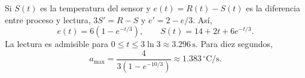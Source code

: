 Si \(S(t)\) es la temperatura del sensor y \(e(t)=R(t)-S(t)\) es la diferencia entre proceso y lectura, \(3S'=R-S\) y \(e'=2-e/3\). Así,
\[
e(t)=6(1-e^{-t/3}),\qquad S(t)=14+2t+6e^{-t/3}.
\]
La lectura es admisible para \(0\le t\le3\ln3\approx3.296\,\mathrm s\). Para diez segundos,
\[
a_{\max}=\frac{4}{3(1-e^{-10/3})}\approx1.383\,{}^\circ\mathrm C/\mathrm s.
\]
